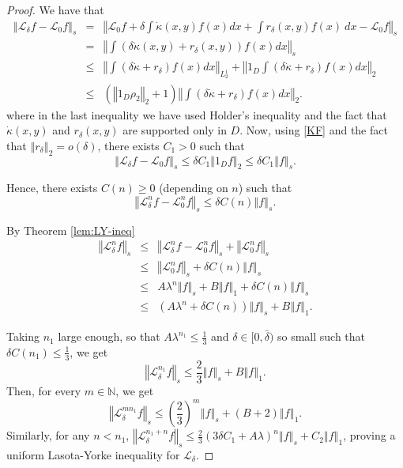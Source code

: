 \documentclass{amsart}
\newcommand\cL{{\mathcal L}}
\newcommand\bN{{\mathbb N}}
\newcommand{\norm}[1]{\left\Vert#1\right\Vert}
\begin{document}
\begin{proof}
We have that 
\begin{eqnarray*}
\norm{\cL_{\delta }f-\cL_{0}f}_{s} &= &\norm{\cL_{0}f+\delta
\int \dot{\kappa}(x,y)f(x)dx+\int {r_{\delta }(x,y)}f(x)\
dx-\cL_{0}f}_{s} \\
&= &\norm{\int (\delta \dot{\kappa}(x,y)+r_{\delta }(x,y))f(x)dx}_{s} \\
& \leq &\norm{\int \left( \delta \dot{\kappa}+ r_\delta \right) f(x) dx}_{L^1_2} + {\norm{1_D\int ( \delta \dot{\kappa}+ r_\delta ) f(x) dx}_{2}}\\
&\leq  &(\norm{1_D\rho_2}_2+1)\norm{\int(\delta \dot{\kappa}+ r_\delta)f(x)dx}_2.
\end{eqnarray*}%
 where in the last inequality we have used Holder's inequality and the fact that $\dot{\kappa}(x,y)$ and $ {r_{\delta }(x,y)}$ are supported only in $D$. Now, using \eqref{KF} and the fact that \(\norm{r_\delta}_2=o(\delta)\), there exists \( C_1>0\) such that
\begin{equation}\label{eq:diff_1}
    \norm{\cL_{\delta }f-\cL_{0}f}_{s} \leq \delta
C_{1}\norm{1_{D}f}_{{2}} \leq \delta C_{1}\norm{f}_{s}.
\end{equation}

Hence, there exists $C(n)\geq 0$ (depending on $n$) such that%
\begin{equation*}
\norm{\cL_{\delta }^{n}f-\cL_{0}^{n}f}_{s}\leq \delta
C(n)\norm{f}_{s}.
\end{equation*}

By Theorem \ref{lem:LY-ineq}
\begin{eqnarray*}
\norm{\cL_{\delta }^{n}f}_{s} &\leq&\norm{\cL_{\delta }^{n}f-\cL_0^n f}_{s}+\norm{\cL_{0 }^{n}f}_{s}\\
&\leq&\norm{\cL_{0}^{n}f}_{s}+\delta C(n)\norm{f}_{s} \\
&\leq &A\lambda ^{n}\norm{f}_{s}+B\norm{f}_{{1}}+\delta C(n)\norm{f}_{s}\\
&\leq &(A\lambda ^{n}+\delta C(n))\norm{f}_{s}+B\norm{f}_{{1}}.
\end{eqnarray*}%

Taking $n_{1}$ large enough, so that $A\lambda ^{n_{1}}\leq\frac{1}{3}$ and $\delta\in [0,\bar\delta)$ so small such that  $\delta C(n_1)\leq\frac{1}{3}$, we get 
\begin{equation*}
\norm{\cL_{\delta}^{n_{1}}f}_{s}\leq
\frac23\norm{f}_{s}+B\norm{f}_{{1}}.
\end{equation*}
Then, for every \(m\in \bN\), we get 
\[\norm{ \cL_{\delta }^{mn_{1}}f}_{s}\leq \left(\frac 23\right)^m\norm{
f}_{s}+(B+2)\norm{f}_{{1}}.\]
Similarly, for any \(n<n_1\), \(\norm{\cL^{n_1+n}_\delta f}_s\leq \frac{2}{3}(3\delta C_1+A\lambda)^n\norm{f}_s + C_2\norm{f}_{1}\), proving a uniform Lasota-Yorke inequality for $\cL_{\delta }.$
\end{proof}
\end{document}
